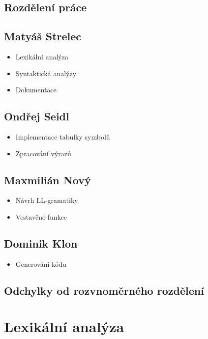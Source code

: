 \documentclass[11pt,a4paper]{article}
\begin{document}
\subsection{Rozdělení práce}

\subsection*{Matyáš Strelec}
\begin{itemize}
	\item Lexikální analýza
	\item Syntaktická analýzy
	\item Dokumentace
\end{itemize}

\subsection*{Ondřej Seidl}
\begin{itemize}
	\item Implementace tabulky symbolů
	\item Zpracování výrazů
\end{itemize}

\subsection*{Maxmilián Nový}
\begin{itemize}
	\item Návrh LL-gramatiky
	\item Vestavěné funkce
\end{itemize}

\subsection*{Dominik Klon}
\begin{itemize}
	\item Generování kódu
\end{itemize}

\subsection{Odchylky od rozvnoměrného rozdělení}
    

\pagebreak{}

\section{Lexikální analýza}
\end{document}
